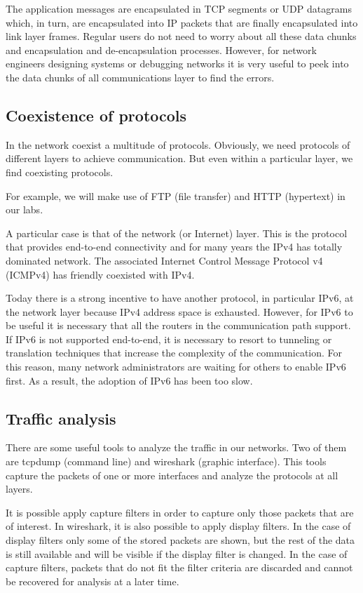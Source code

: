 The application messages are encapsulated in TCP segments or UDP datagrams which, in turn, are encapsulated into IP packets that are finally encapsulated into link layer frames.
Regular users do not need to worry about all these data chunks and encapsulation and de-encapsulation processes.
However, for network engineers designing systems or debugging networks it is very useful to peek into the data chunks of all communications layer to find the errors.

\subsection{Coexistence of protocols}

In the network coexist a multitude of protocols.
Obviously, we need protocols of different layers to achieve communication.
But even within a particular layer, we find coexisting protocols.

For example, we will make use of FTP (file transfer) and HTTP (hypertext) in our labs.

A particular case is that of the network (or Internet) layer.
This is the protocol that provides end-to-end connectivity and for many years the IPv4 has totally dominated network.
The associated Internet Control Message Protocol v4 (ICMPv4) has friendly coexisted with IPv4.

Today there is a strong incentive to have another protocol, in particular IPv6, at the network layer because IPv4 address space is exhausted.
However, for IPv6 to be useful it is necessary that all the routers in the communication path support.
If IPv6 is not supported end-to-end, it is necessary to resort to tunneling or translation techniques that increase the complexity of the communication.
For this reason, many network administrators are waiting for others to enable IPv6 first.
As a result, the adoption of IPv6 has been too slow.

\subsection{Traffic analysis}

There are some useful tools to analyze the traffic in our networks.
Two of them are tcpdump (command line) and wireshark (graphic interface).
This tools capture the packets of one or more interfaces and analyze the protocols at all layers.

It is possible apply capture filters in order to capture only those packets that are of interest.
In wireshark, it is also possible to apply display filters.
In the case of display filters only some of the stored packets are shown, but the rest of the data is still available and will be visible if the display filter is changed.
In the case of capture filters, packets that do not fit the filter criteria are discarded and cannot be recovered for analysis at a later time.

